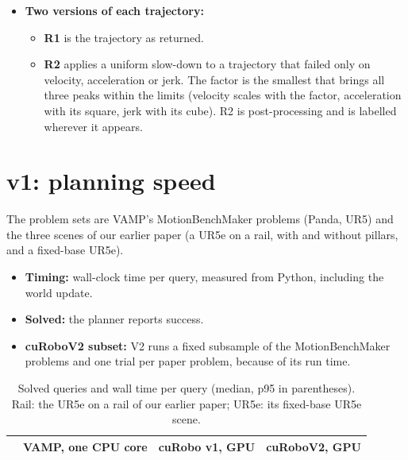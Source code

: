 \documentclass[11pt]{article}
\begin{document}
\begin{itemize}
  The UR5e jerk limit is \jerkLimit\,rad/s\textsuperscript{3}, taken from cuRobo's shipped configuration, since Universal Robots publishes none. Planning plus time-parameterisation (T\textsubscript{ready}) must finish within T $=$ \budget\,s.
  \item \textbf{Two versions of each trajectory:}
  \begin{itemize}
    \item \textbf{R1} is the trajectory as returned.
    \item \textbf{R2} applies a uniform slow-down to a trajectory that failed only on velocity, acceleration or jerk. The factor is the smallest that brings all three peaks within the limits (velocity scales with the factor, acceleration with its square, jerk with its cube). R2 is post-processing and is labelled wherever it appears.
  \end{itemize}
\end{itemize}

\section{v1: planning speed}
\label{sec:v1}
The problem sets are VAMP's MotionBenchMaker problems (Panda, UR5) and the three scenes of our earlier paper (a UR5e on a rail, with and without pillars, and a fixed-base UR5e).
\begin{itemize}
  \item \textbf{Timing:} wall-clock time per query, measured from Python, including the world update.
  \item \textbf{Solved:} the planner reports success.
  \item \textbf{cuRoboV2 subset:} V2 runs a fixed subsample of the MotionBenchMaker problems and one trial per paper problem, because of its run time.
\end{itemize}

\begin{table}[ht]\centering\footnotesize
\caption{Solved queries and wall time per query (median, p95 in parentheses). Rail: the UR5e on a rail of our earlier paper; UR5e: its fixed-base UR5e scene.}\label{tab:v1}
\setlength{\tabcolsep}{4pt}
\begin{tabular}{@{}l rl rl rl@{}}\toprule
 & \multicolumn{2}{c}{VAMP, one CPU core} & \multicolumn{2}{c}{cuRobo v1, GPU} & \multicolumn{2}{c}{cuRoboV2, GPU} \\\midrule
\end{tabular}
\end{table}
\end{document}
